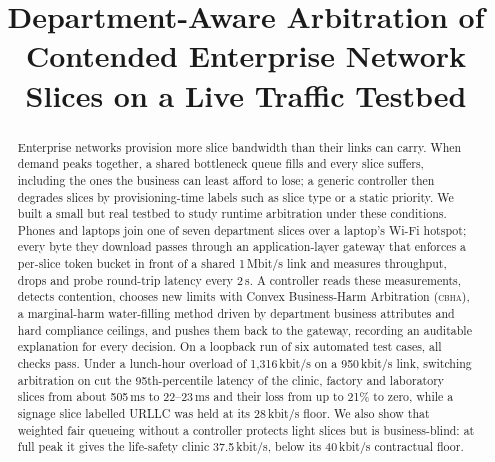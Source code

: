 \documentclass[conference]{IEEEtran}
\newcommand{\cbha}{\textsc{cbha}}
\newcommand{\kbps}{\,kbit/s}
\begin{document}
\title{Department-Aware Arbitration of Contended Enterprise Network Slices on a Live Traffic Testbed}

\author{
\and
{}
\and
{}
\and
{}
}

\maketitle

\begin{abstract}
Enterprise networks provision more slice bandwidth than their links can carry. When demand peaks together, a shared bottleneck queue fills and every slice suffers, including the ones the business can least afford to lose; a generic controller then degrades slices by provisioning-time labels such as slice type or a static priority. We built a small but real testbed to study runtime arbitration under these conditions. Phones and laptops join one of seven department slices over a laptop's Wi-Fi hotspot; every byte they download passes through an application-layer gateway that enforces a per-slice token bucket in front of a shared 1\,Mbit/s link and measures throughput, drops and probe round-trip latency every 2\,s. A controller reads these measurements, detects contention, chooses new limits with Convex Business-Harm Arbitration (\cbha{}), a marginal-harm water-filling method driven by department business attributes and hard compliance ceilings, and pushes them back to the gateway, recording an auditable explanation for every decision. On a loopback run of six automated test cases, all checks pass. Under a lunch-hour overload of 1{,}316\kbps{} on a 950\kbps{} link, switching arbitration on cut the 95th-percentile latency of the clinic, factory and laboratory slices from about 505\,ms to 22--23\,ms and their loss from up to 21\% to zero, while a signage slice labelled URLLC was held at its 28\kbps{} floor. We also show that weighted fair queueing without a controller protects light slices but is business-blind: at full peak it gives the life-safety clinic 37.5\kbps{}, below its 40\kbps{} contractual floor.
\end{abstract}
\end{document}
